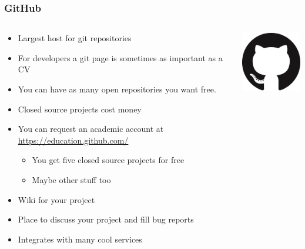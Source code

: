 \begin{frame}
	\frametitle{GitHub}
	\begin{columns}
		\begin{column}{0.7\textwidth}
			\begin{itemize}[<+->]
				\item Largest host for git repositories
				\item For developers a git page is sometimes as important as a CV
				\item You can have as many open repositories you want free.
				\item Closed source projects cost money
				\item You can request an academic account at \url{https://education.github.com/}
					\begin{itemize}[<+->]
						\item You get five closed source projects for free
						\item Maybe other stuff too
					\end{itemize}
				\item Wiki for your project
				\item Place to discuss your project and fill bug reports
				\item Integrates with many cool services
			\end{itemize}
		\end{column}
		\begin{column}{0.3\textwidth}
			\includegraphics[width=\textwidth]{./pictures/GitHub.png}
		\end{column}
\end{columns}
\end{frame}
